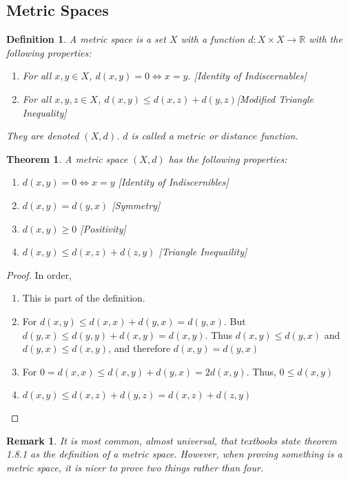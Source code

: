 \documentclass[crop=false,class=book]{standalone}
\theoremstyle{mystyle}
\newtheorem{theorem}{Theorem}[section]
\newtheorem{definition}{Definition}[section]
\newtheorem{remark}{Remark}[section]
\begin{document}
\subsection{Metric Spaces}
\begin{definition}
A metric space is a set $X$ with a function $d:X\times X\rightarrow \mathbb{R}$ with the following properties:
\begin{enumerate}
\item For all $x,y\in X$, $d(x,y) = 0\Leftrightarrow x=y$. \hfill [Identity of Indiscernables]
\item For all $x,y,z\in X$, $d(x,y) \leq d(x,z)+d(y,z)$\hfill [Modified Triangle Inequality]
\end{enumerate}
They are denoted $(X,d)$. $d$ is called a $metric$ or $distance$ function.
\end{definition}
\begin{theorem}
A metric space $(X,d)$ has the following properties:
\begin{enumerate}
    \item $d(x,y) = 0 \Leftrightarrow x=y$ \hfill [Identity of Indiscernibles]
    \item $d(x,y) = d(y,x)$ \hfill [Symmetry]
    \item $d(x,y) \geq 0$ \hfill [Positivity]
    \item $d(x,y) \leq d(x,z)+d(z,y)$ \hfill [Triangle Inequaility]
\end{enumerate}
\end{theorem}
\begin{proof}
In order,
\begin{enumerate}
    \item This is part of the definition.
    \item For $d(x,y) \leq d(x,x)+d(y,x) = d(y,x)$. But $d(y,x) \leq d(y,y)+d(x,y) = d(x,y)$. Thus $d(x,y)\leq d(y,x)$ and $d(y,x) \leq d(x,y)$, and therefore $d(x,y) = d(y,x)$
    \item For $0=d(x,x) \leq d(x,y)+d(y,x) = 2d(x,y)$. Thus, $0\leq d(x,y)$
    \item $d(x,y)\leq d(x,z)+d(y,z) = d(x,z)+d(z,y)$
\end{enumerate}
\end{proof}
\begin{remark}
It is most common, almost universal, that textbooks state theorem 1.8.1 as the definition of a metric space. However, when proving something is a metric space, it is nicer to prove two things rather than four.
\end{remark}
\end{document}
